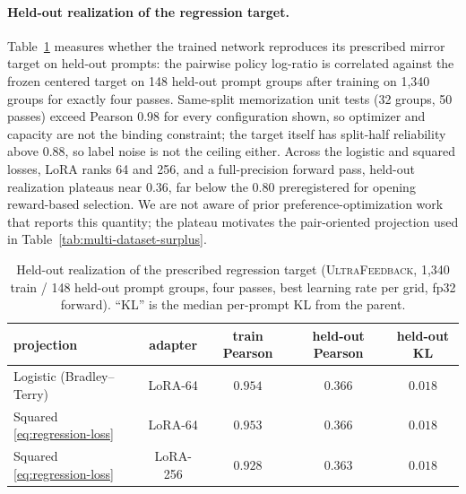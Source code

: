 \documentclass{article}
\theoremstyle{remark}
\theoremstyle{plain}
\begin{document}
\paragraph{Held-out realization of the regression target.}
Table~\ref{tab:uf-realization} measures whether the trained network reproduces its prescribed mirror target on held-out prompts: the pairwise policy log-ratio is correlated against the frozen centered target on 148 held-out prompt groups after training on 1{,}340 groups for exactly four passes. Same-split memorization unit tests (32 groups, 50 passes) exceed Pearson $0.98$ for every configuration shown, so optimizer and capacity are not the binding constraint; the target itself has split-half reliability above $0.88$, so label noise is not the ceiling either. Across the logistic and squared losses, LoRA ranks 64 and 256, and a full-precision forward pass, held-out realization plateaus near $0.36$, far below the $0.80$ preregistered for opening reward-based selection. We are not aware of prior preference-optimization work that reports this quantity; the plateau motivates the pair-oriented projection used in Table~\ref{tab:multi-dataset-surplus}.

\begin{table}[htbp]
\centering\footnotesize
\setlength{\tabcolsep}{3.5pt}
\caption{Held-out realization of the prescribed regression target (\textsc{UltraFeedback}, 1{,}340 train / 148 held-out prompt groups, four passes, best learning rate per grid, fp32 forward). ``KL'' is the median per-prompt KL from the parent.}
\label{tab:uf-realization}
\begin{tabular}{lcccc}
\toprule
projection & adapter & train Pearson & held-out Pearson & held-out KL\\
\midrule
Logistic (Bradley--Terry) & LoRA-64 & $0.954$ & $0.366$ & $0.018$\\
Squared \eqref{eq:regression-loss} & LoRA-64 & $0.953$ & $0.366$ & $0.018$\\
Squared \eqref{eq:regression-loss} & LoRA-256 & $0.928$ & $0.363$ & $0.018$\\
\bottomrule
\end{tabular}
\end{table}
\end{document}
